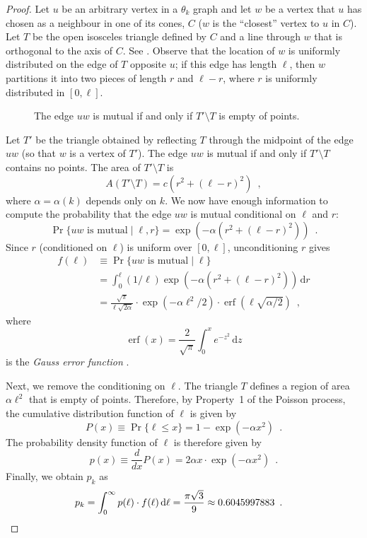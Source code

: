 \documentclass{patmorin}
\DeclareMathOperator{\erf}{erf}
\begin{document}
\begin{proof}
  Let $u$ be an arbitrary vertex in a $\theta_k$ graph and let $w$
  be a vertex that $u$ has chosen as a neighbour in one of its cones,
  $C$ ($w$ is the ``closest'' vertex to $u$ in $C$).  Let $T$ be the
  open isosceles triangle defined by $C$ and a line
  through $w$ that is orthogonal to the axis of $C$. See .
  Observe that the location of $w$ is uniformly distributed on the
  edge of $T$ opposite $u$;  if this edge has length $\ell$, then $w$
  partitions it into two pieces of length $r$ and $\ell-r$, where $r$
  is uniformly distributed in $[0,\ell]$.

  \begin{figure}
    \caption{The edge $uw$ is mutual if and only if $T'\setminus T$ 
       is empty of points.}
  \end{figure}
 
  Let $T'$ be the triangle obtained by reflecting $T$ through the midpoint
  of the edge $uw$ (so that $w$ is a vertex of $T'$). The edge $uw$ is
  mutual if and only if $T'\setminus T$ contains no points.  The area
  of $T'\setminus T$ is
  \[
     A(T'\setminus T) = c(r^2+(\ell-r)^2)  \enspace ,
  \]
  where $\alpha=\alpha(k)$ depends only on $k$.  We now have enough information
  to compute the probability that the edge $uw$ is mutual conditional
  on $\ell$ and $r$:
  \[
    \Pr\{\mbox{$uw$ is mutual} \mid \ell,r\} = \exp(-\alpha(r^2+(\ell-r)^2))
      \enspace .
  \]
  Since $r$ (conditioned on $\ell$) is uniform over $[0,\ell]$, unconditioning
  $r$ gives
  \begin{align*}
    f(\ell) & \equiv \Pr\{\mbox{$uw$ is mutual} \mid \ell\} \\
     & = \int_0^\ell (1/\ell)\exp(-\alpha(r^2+(\ell-r)^2))\,\mathrm{d}r \\
     & = \frac{\sqrt{\pi}}{\ell\sqrt{2\alpha}}
            \cdot\exp(-\alpha\ell^2/2)
            \cdot\erf(\ell\sqrt{\alpha/2})  \enspace ,
  \end{align*}
  where 
  \[ \erf(x)=\frac{2}{\sqrt{\pi}}\int_0^x e^{-z^2}\,\mathrm{d}z \]
  is the \emph{Gauss error function} \cite{gauss-error}.  

  Next, we remove the conditioning on $\ell$.  The triangle $T$ defines a
  region of area $\alpha\ell^2$ that is empty of points.  Therefore,
  by Property~1 of the Poisson process, the cumulative distribution
  function of $\ell$ is given by
  \[
    P(x) \equiv \Pr\{\ell \le x\} = 1-\exp(-\alpha x^2) \enspace .
  \]
  The probability density function of $\ell$ is therefore given by 
  \[
     p(x) \equiv \frac{d}{dx}P(x) =
     2\alpha x\cdot\exp(-\alpha x^2) \enspace .
  \]
  Finally, we obtain $p_k$ as 
  \begin{align*}
     p_k = \int_0^\infty p(\ell)\cdot f(\ell)\,\mathrm{d}\ell 
     = \frac{\pi\sqrt{3}}{9}
      \approx 0.6045997883  \enspace . & \qedhere
  \end{align*}
\end{proof}
\end{document}

